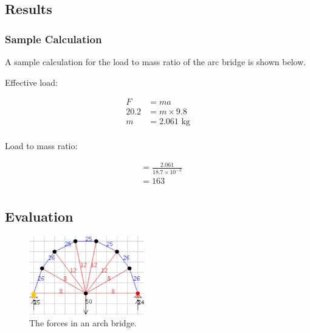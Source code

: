 \documentclass[a4paper,11pt]{article}
\begin{document}
\subsection{Results}

\begin{center}
\end{center}


\subsubsection{Sample Calculation}

A sample calculation for the load to mass ratio of the arc bridge is shown
below.

Effective load:

$$
\begin{aligned}
F & = ma \\
20.2 & = m \times 9.8 \\
m & = 2.061\mbox{ kg} \\
\end{aligned}
$$

Load to mass ratio:

$$
\begin{aligned}
& = \frac{2.061}{18.7 \times 10^{-3}} \\
& = 163 \\
\end{aligned}
$$


\subsection{Evaluation}

\begin{figure}
\begin{center}
\includegraphics[width=5cm]{figures/arch-2.png}
\end{center}
\caption{The forces in an arch bridge.}
\label{config:arch}
\end{figure}
\end{document}
